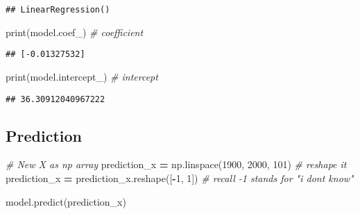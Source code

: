 \documentclass[
]{book}
\newenvironment{Shaded}{\begin{snugshade}}{\end{snugshade}}
\newcommand{\BuiltInTok}[1]{#1}
\newcommand{\CommentTok}[1]{\textcolor[rgb]{0.56,0.35,0.01}{\textit{#1}}}
\newcommand{\DecValTok}[1]{\textcolor[rgb]{0.00,0.00,0.81}{#1}}
\newcommand{\NormalTok}[1]{#1}
\newcommand{\OperatorTok}[1]{\textcolor[rgb]{0.81,0.36,0.00}{\textbf{#1}}}
\begin{document}
\begin{verbatim}
## LinearRegression()
\end{verbatim}

\begin{Shaded}
\begin{Highlighting}[]
\BuiltInTok{print}\NormalTok{(model.coef\_) }\CommentTok{\# coefficient}
\end{Highlighting}
\end{Shaded}

\begin{verbatim}
## [-0.01327532]
\end{verbatim}

\begin{Shaded}
\begin{Highlighting}[]
\BuiltInTok{print}\NormalTok{(model.intercept\_) }\CommentTok{\# intercept}
\end{Highlighting}
\end{Shaded}

\begin{verbatim}
## 36.30912040967222
\end{verbatim}

\hypertarget{prediction}{%
\subsection{Prediction}\label{prediction}}

\begin{Shaded}
\begin{Highlighting}[]
\CommentTok{\# New X as np array}
\NormalTok{prediction\_x }\OperatorTok{=}\NormalTok{ np.linspace(}\DecValTok{1900}\NormalTok{, }\DecValTok{2000}\NormalTok{, }\DecValTok{101}\NormalTok{)}
\CommentTok{\# reshape it}
\NormalTok{prediction\_x }\OperatorTok{=}\NormalTok{ prediction\_x.reshape([}\OperatorTok{{-}}\DecValTok{1}\NormalTok{, }\DecValTok{1}\NormalTok{]) }\CommentTok{\# recall {-}1 stands for "i don\textquotesingle{}t know"}
\end{Highlighting}
\end{Shaded}

\begin{Shaded}
\begin{Highlighting}[]
\NormalTok{model.predict(prediction\_x)}
\end{Highlighting}
\end{Shaded}
\end{document}
